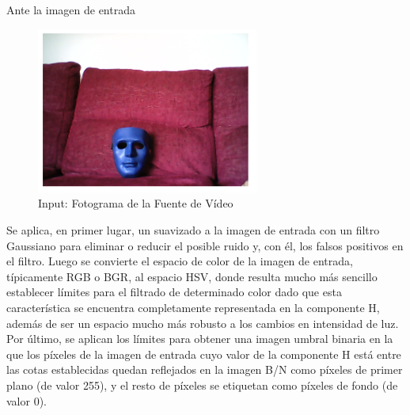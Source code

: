 \begin{center}
Ante la imagen de entrada
\end{center}
\begin{figure}[!hbtp]  \centering\noindent
    \includegraphics[width=0.65\textwidth]{figures/cf_input.png}
    \caption{Input: Fotograma de la Fuente de Vídeo}
    \label{input}
\end{figure}

Se aplica, en primer lugar, un suavizado a la imagen de entrada con un filtro Gaussiano para eliminar o reducir el posible ruido y, con él, los falsos positivos en el filtro. Luego se convierte el espacio de color de la imagen de entrada, típicamente RGB o BGR, al espacio HSV, donde resulta mucho más sencillo establecer límites para el filtrado de determinado color dado que esta característica se encuentra completamente representada en la componente H, además de ser un espacio mucho más robusto a los cambios en intensidad de luz. Por último, se aplican los límites para obtener una imagen umbral binaria en la que los píxeles de la imagen de entrada cuyo valor de la componente H está entre las cotas establecidas quedan reflejados en la imagen B/N como píxeles de primer plano (de valor 255), y el resto de píxeles se etiquetan como píxeles de fondo (de valor 0).

